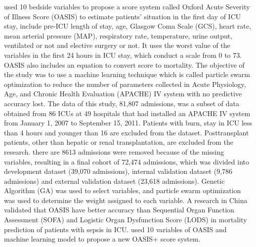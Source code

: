 \documentclass[12pt,a4paper,english
]{tunithesis}
\begin{document}
\textcite{johnson2013} used 10 bedside variables to propose a score system called Oxford Acute Severity of Illness Score (OASIS) to estimate patients' situation in the first day of ICU stay, include pre-ICU length of stay, age, Glasgow Coma Scale (GCS), heart rate, mean arterial pressure (MAP), respiratory rate, temperature, urine output, ventilated or not and elective surgery or not. It uses the worst value of the variables in the first 24 hours in ICU stay, which conduct a scale from 0 to 73. OASIS also includes an equation to convert score to mortality. The objective of the study was to use a machine learning technique which is called particle swarm optimization to reduce the number of parameters collected in Acute Physiology, Age, and Chronic Health Evaluation (APACHE) IV system with no predictive accuracy lost. The data of this study, 81,807 admissions, was a subset of data obtained from 86 ICUs at 49 hospitals that had installed an APACHE IV system from January 1, 2007 to September 15, 2011. Patients with burn, stay in ICU less than 4 hours and younger than 16 are excluded from the dataset. Posttransplant patients, other than hepatic or renal transplantation, are excluded from the research. there are 8613 admissions were removed because of the missing variables, resulting in a final cohort of 72,474 admissions, which was divided into development dataset (39,070 admissions), internal validation dataset (9,786 admissions) and external validation dataset (23,618 admissions). Genetic Algorithm (GA) was used to select variables, and particle swarm optimization was used to determine the weight assigned to each variable. A research in China validated that OASIS have better accuracy than Sequential Organ Function Assessment (SOFA) and Logistic Organ Dysfunction Score (LODS) in mortality prediction of patients with sepsis in ICU. \parencite{hu2020} \textcite{el-manzalawy2021} used 10 variables of OASIS and machine learning model to propose a new OASIS+ score system.
\end{document}
